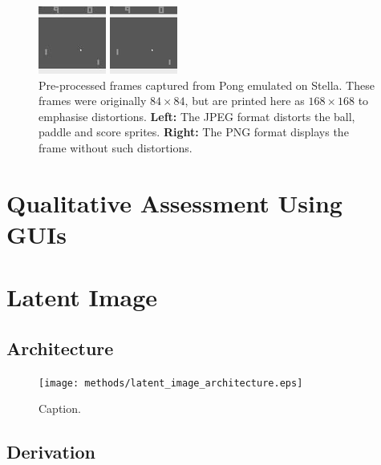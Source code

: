 \begin{figure}[h!]
\centering
\captionsetup{justification=centering}
\begin{multicols}{1}
    \includegraphics[scale=2.0]{figures/related_work/pong_729_pre_processed.jpeg}\par
    \includegraphics[scale=2.0]{figures/related_work/pong_729_pre_processed.png}\par
\end{multicols}
\caption{Pre-processed frames captured from Pong emulated on Stella. These frames were originally $84\times 84$, but are printed here as $168\times 168$ to emphasise distortions. \textbf{Left:} The JPEG format distorts the ball, paddle and score sprites. \textbf{Right:} The PNG format displays the frame without such distortions.}
\label{fig:pong_729_pre_processed}
\end{figure}


%
%
%
%
%
\section{Qualitative Assessment Using GUIs}


%
%
%
%
%
\section{Latent Image}
\lipsum[2]
\subsection{Architecture}
\begin{figure}[H]
\centering
\captionsetup{justification=centering}
\texttt{[image: methods/latent\_image\_architecture.eps]}
\caption{Caption.}
\label{fig:latent_image_architecture}
\end{figure}

\subsection{Derivation}

